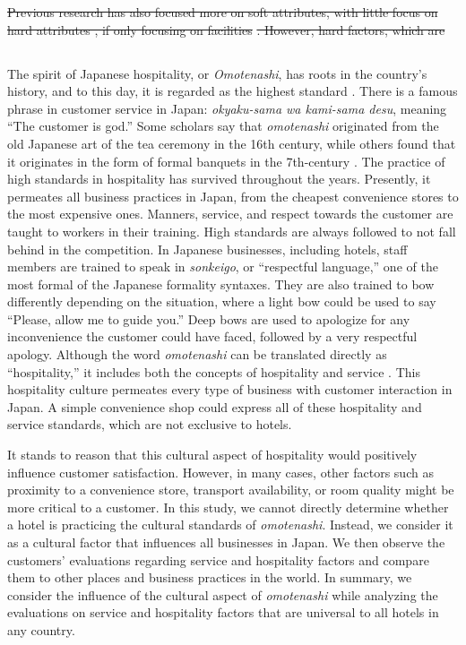 \documentclass[smallextended,natbib]{svjour3}       %
\providecommand{\DIFadd}[1]{{\protect\color{blue}\uwave{#1}}} %
\providecommand{\DIFdel}[1]{{\protect\color{red}\sout{#1}}}                      %
\providecommand{\DIFaddbegin}{} %
\providecommand{\DIFdelbegin}{} %
\providecommand{\DIFdelend}{} %
\newcommand{\DIFscaledelfig}{0.5}
\newlength{\DIFdelgraphicswidth} %
\newlength{\DIFdelgraphicsheight} %
\newcommand{\DIFaddincludegraphics}[2][]{{\color{blue}\fbox{\DIFOincludegraphics[#1]{#2}}}} %
\newcommand{\DIFdelincludegraphics}[2][]{%
\sbox{\DIFdelgraphicsbox}{\DIFOincludegraphics[#1]{#2}}%
\settoboxwidth{\DIFdelgraphicswidth}{\DIFdelgraphicsbox} %
\settoboxtotalheight{\DIFdelgraphicsheight}{\DIFdelgraphicsbox} %
\scalebox{\DIFscaledelfig}{%
\parbox[b]{\DIFdelgraphicswidth}{\usebox{\DIFdelgraphicsbox}\\[-\baselineskip] \rule{\DIFdelgraphicswidth}{0em}}\llap{\resizebox{\DIFdelgraphicswidth}{\DIFdelgraphicsheight}{%
\setlength{\unitlength}{\DIFdelgraphicswidth}%
\begin{picture}(1,1)%
\thicklines\linethickness{2pt} %
{\color[rgb]{1,0,0}\put(0,0){\framebox(1,1){}}}%
{\color[rgb]{1,0,0}\put(0,0){\line( 1,1){1}}}%
{\color[rgb]{1,0,0}\put(0,1){\line(1,-1){1}}}%
\end{picture}%
}\hspace*{3pt}}} %
} %
\DeclareRobustCommand{\DIFaddbegin}{\DIFOaddbegin \let\includegraphics\DIFaddincludegraphics} %
\DeclareRobustCommand{\DIFdelbegin}{\DIFOdelbegin \let\includegraphics\DIFdelincludegraphics} %
\DeclareRobustCommand{\DIFdelend}{\DIFOaddend \let\includegraphics\DIFOincludegraphics} %
\begin{document}
  \DIFdelbegin \DIFdel{Previous research has also focused more on soft attributes, with little focus on hard attributes , if only focusing on facilities }%
\DIFdel{. However, hard factors, which are }\DIFdelend \DIFaddbegin \subsection{\DIFadd{Japanese hospitality and service: }\textit{\DIFadd{Omotenashi}}}\label{theory_omotenashi}

    The spirit of Japanese hospitality, or \textit{Omotenashi}, has roots in the country’s history, and to this day, it is regarded as the highest standard \cite[][]{ikeda2013omotenashi, al2015characteristics}. There is a famous phrase in customer service in Japan: \textit{okyaku-sama wa kami-sama desu}, meaning ``The customer is god.'' Some scholars say that \textit{omotenashi} originated from the old Japanese art of the tea ceremony in the 16th century, while others found that it originates in the form of formal banquets in the 7th-century \cite[][]{aishima2015origin}. The practice of high standards in hospitality has survived throughout the years. Presently, it permeates all business practices in Japan, from the cheapest convenience stores to the most expensive ones. Manners, service, and respect towards the customer are taught to workers in their training. High standards are always followed to not fall behind in the competition. In Japanese businesses, including hotels, staff members are trained to speak in \textit{sonkeigo}, or ``respectful language,'' one of the most formal of the Japanese formality syntaxes. They are also trained to bow differently depending on the situation, where a light bow could be used to say ``Please, allow me to guide you.'' Deep bows are used to apologize for any inconvenience the customer could have faced, followed by a very respectful apology. Although the word \textit{omotenashi} can be translated directly as ``hospitality,'' it includes both the concepts of hospitality and service \cite[][]{Kuboyama2020}. This hospitality culture permeates every type of business with customer interaction in Japan. A simple convenience shop could express all of these hospitality and service standards, which are not exclusive to hotels.  

    It stands to reason that this cultural aspect of hospitality would positively influence customer satisfaction. However, in many cases, other factors such as proximity to a convenience store, transport availability, or room quality might be more critical to a customer.  In this study, we cannot directly determine whether a hotel is practicing the cultural standards of \textit{omotenashi}. Instead, we consider it as a cultural factor that influences all businesses in Japan. We then observe the customers' evaluations regarding service and hospitality factors and compare them to other places and business practices in the world. In summary, we consider the influence of the cultural aspect of \textit{omotenashi} while analyzing the evaluations on service and hospitality factors that are universal to all hotels in any country.
\end{document}
